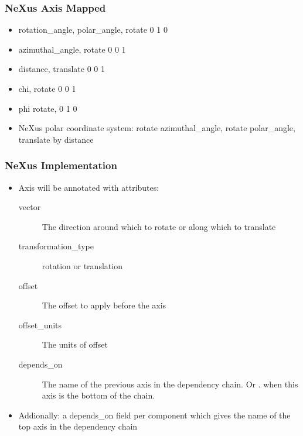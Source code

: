 \documentclass{beamer}
\begin{document}
\begin{frame} \frametitle{NeXus Axis Mapped}
\begin{itemize}
\item rotation\_angle, polar\_angle, rotate 0 1 0
\item azimuthal\_angle, rotate 0 0 1
\item distance, translate 0 0  1
\item chi, rotate 0 0 1
\item phi rotate, 0 1 0
\item NeXus polar coordinate system: rotate azimuthal\_angle, rotate polar\_angle, 
 translate by distance
\end{itemize}
\end{frame}

\begin{frame} \frametitle{NeXus Implementation}
\begin{itemize}
\item Axis will be annotated with attributes:
\begin{description}
\item[vector] The direction around which to rotate or along which to translate
\item[transformation\_type] rotation or translation
\item[offset] The offset to apply before the axis
\item[offset\_units] The units of offset
\item[depends\_on]The name of the previous axis in the dependency chain. Or . 
 when this axis is the bottom of the chain.
\end{description}
\item Addionally: a depends\_on field per component which gives the name of the 
 top axis in the dependency chain 
\end{itemize}
\end{frame}
\end{document}
